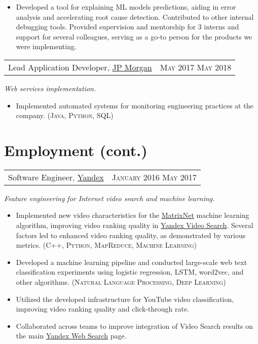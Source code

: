 \documentclass{article}
\makeatletter
\newcommand{\whatwherewhen}[3]{
\noindent\begin{tabular*}{\columnwidth}{@{}@{\extracolsep{\fill}}lr@{}}
#1, #2 & \textsc{#3}
\end{tabular*}}
\newcommand{\smallvskip}{\vskip2mm}
\makeatother
\begin{document}
\begin{itemize}
\begin{itemize}
  \item Developed a tool for explaining ML models predictions, aiding in error analysis and accelerating root cause detection. Contributed to other internal debugging tools. Provided supervision and mentorship for 3 interns and support for several colleagues, serving as a go-to person for the products we were implementing.

  \end{itemize}

\end{itemize}


\smallvskip
\whatwherewhen{Lead Application Developer}{\href{https://www.jpmorganchase.com/}{JP Morgan}}{May 2017 \textendash{} May 2018}

\textit{Web services implementation.}

\begin{itemize}

\item Implemented automated systems for monitoring engineering practices at the company. (\textsc{Java}, \textsc{Python}, \textsc{SQL})

\end{itemize}


\newpage


\section{Employment (cont.)}


\smallvskip
\whatwherewhen{Software Engineer}{\href{https://yandex.com/company/}{Yandex}}{January 2016 \textendash{} May 2017}

\textit{Feature engineering for Internet video search and machine learning.}

\begin{itemize}

\item  Implemented new video characteristics for the \href{https://yandex.com/company/technologies/matrixnet/}{MatrixNet} machine learning algorithm, improving video ranking quality in \href{https://yandex.com/video/}{Yandex Video Search}. Several factors led to enhanced video ranking quality, as demonstrated by various metrics. (\textsc{C++}, \textsc{Python}, \textsc{MapReduce}, \textsc{Machine Learning})

\item Developed a machine learning pipeline and conducted large-scale web text classification experiments using logistic regression, LSTM, word2vec, and other algorithms. (\textsc{Natural Language Processing}, \textsc{Deep Learning})

\item Utilized the developed infrastructure for YouTube video classification, improving video ranking quality and click-through rate.

\item Collaborated across teams to improve integration of Video Search results on the main \href{https://yandex.com/}{Yandex Web Search} page.

\end{itemize}
\end{document}
